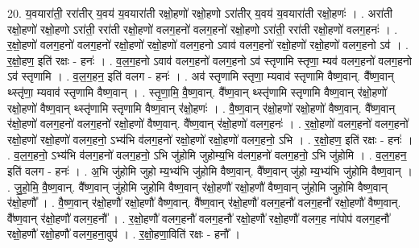 \documentclass[17pt]{extarticle}
\begin{document}
20. य॒वयारा॑ती॒ ररा॑तीर् य॒वय॑ य॒वयारा॑ती रक्षो॒हणो॑ रक्षो॒हणो ऽरा॑तीर् य॒वय॑ य॒वयारा॑ती रक्षो॒हणः॑ । . अरा॑ती रक्षो॒हणो॑ रक्षो॒हणो ऽरा॑ती॒ ररा॑ती रक्षो॒हणो॑ वलग॒हनो॑ वलग॒हनो॑ रक्षो॒हणो ऽरा॑ती॒ ररा॑ती रक्षो॒हणो॑ वलग॒हनः॑ । . र॒क्षो॒हणो॑ वलग॒हनो॑ वलग॒हनो॑ रक्षो॒हणो॑ रक्षो॒हणो॑ वलग॒हनो ऽवाव॑ वलग॒हनो॑ रक्षो॒हणो॑ रक्षो॒हणो॑ वलग॒हनो ऽव॑ । . र॒क्षो॒हण॒ इति॑ रक्षः - हनः॑ । . व॒ल॒ग॒हनो ऽवाव॑ वलग॒हनो॑ वलग॒हनो ऽव॑ स्तृणामि स्तृणा॒ म्यव॑ वलग॒हनो॑ वलग॒हनो ऽव॑ स्तृणामि । . व॒ल॒ग॒हन॒ इति॑ वलग - हनः॑ । . अव॑ स्तृणामि स्तृणा॒ म्यवाव॑ स्तृणामि वैष्ण॒वान्. वै᳚ष्ण॒वान् थ्स्तृ॑णा॒ म्यवाव॑ स्तृणामि वैष्ण॒वान् । . स्तृ॒णा॒मि॒ वै॒ष्ण॒वान्. वै᳚ष्ण॒वान् थ्स्तृ॑णामि स्तृणामि वैष्ण॒वान् र॑क्षो॒हणो॑ रक्षो॒हणो॑ वैष्ण॒वान् थ्स्तृ॑णामि स्तृणामि वैष्ण॒वान् र॑क्षो॒हणः॑ । . वै॒ष्ण॒वान् र॑क्षो॒हणो॑ रक्षो॒हणो॑ वैष्ण॒वान्. वै᳚ष्ण॒वान् र॑क्षो॒हणो॑ वलग॒हनो॑ वलग॒हनो॑ रक्षो॒हणो॑ वैष्ण॒वान्. वै᳚ष्ण॒वान् र॑क्षो॒हणो॑ वलग॒हनः॑ । . र॒क्षो॒हणो॑ वलग॒हनो॑ वलग॒हनो॑ रक्षो॒हणो॑ रक्षो॒हणो॑ वलग॒हनो॒ ऽभ्य॑भि व॑लग॒हनो॑ रक्षो॒हणो॑ रक्षो॒हणो॑ वलग॒हनो॒ ऽभि । . र॒क्षो॒हण॒ इति॑ रक्षः - हनः॑ । . व॒ल॒ग॒हनो॒ ऽभ्य॑भि व॑लग॒हनो॑ वलग॒हनो॒ ऽभि जु॑होमि जुहोम्य॒भि व॑लग॒हनो॑ वलग॒हनो॒ ऽभि जु॑होमि । . व॒ल॒ग॒हन॒ इति॑ वलग - हनः॑ । . अ॒भि जु॑होमि जुहो म्य॒भ्य॑भि जु॑होमि वैष्ण॒वान्. वै᳚ष्ण॒वान् जु॑हो म्य॒भ्य॑भि जु॑होमि वैष्ण॒वान् । . जु॒हो॒मि॒ वै॒ष्ण॒वान्. वै᳚ष्ण॒वान् जु॑होमि जुहोमि वैष्ण॒वान् र॑क्षो॒हणौ॑ रक्षो॒हणौ॑ वैष्ण॒वान् जु॑होमि जुहोमि वैष्ण॒वान् र॑क्षो॒हणौ᳚ । . वै॒ष्ण॒वान् र॑क्षो॒हणौ॑ रक्षो॒हणौ॑ वैष्ण॒वान्. वै᳚ष्ण॒वान् र॑क्षो॒हणौ॑ वलग॒हनौ॑ वलग॒हनौ॑ रक्षो॒हणौ॑ वैष्ण॒वान्. वै᳚ष्ण॒वान् र॑क्षो॒हणौ॑ वलग॒हनौ᳚ । . र॒क्षो॒हणौ॑ वलग॒हनौ॑ वलग॒हनौ॑ रक्षो॒हणौ॑ रक्षो॒हणौ॑ वलग॒ह ना॑पोप॑ वलग॒हनौ॑ रक्षो॒हणौ॑ रक्षो॒हणौ॑ वलग॒हना॒वुप॑ । . र॒क्षो॒हणा॒विति॑ रक्षः - हनौ᳚ । \newline
\end{document}
